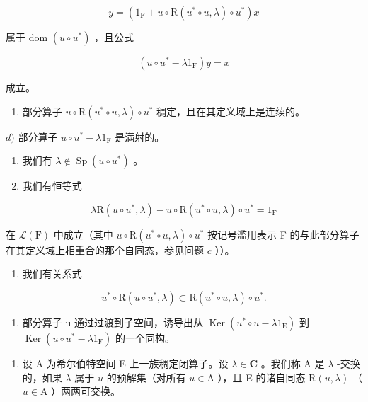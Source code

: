 \[
y = (1 _ {\mathrm{F}} + u \circ \mathrm{R} (u ^ {*} \circ u, \lambda) \circ u ^ {*}) x
\]

属于 dom \((u\circ u^{*})\) ，且公式

\[
(u \circ u ^ {*} - \lambda 1 _ {\mathrm{F}}) y = x
\]

成立。

\begin{enumerate}
\def\labelenumi{\alph{enumi})}
\setcounter{enumi}{2}
\tightlist
\item
  部分算子 \(u \circ \mathrm{R}(u^* \circ u, \lambda) \circ u^*\) 稠定，且在其定义域上是连续的。
\end{enumerate}

\(d)\) 部分算子 \(u \circ u^{*} - \lambda 1_{\mathrm{F}}\) 是满射的。

\begin{enumerate}
\def\labelenumi{\alph{enumi})}
\setcounter{enumi}{4}
\item
  我们有 \(\lambda \notin \operatorname{Sp}(u \circ u^{*})\) 。
\item
  我们有恒等式
\end{enumerate}

\[
\lambda \mathrm{R} (u \circ u ^ {*}, \lambda) - u \circ \mathrm{R} (u ^ {*} \circ u, \lambda) \circ u ^ {*} = 1 _ {\mathrm{F}}
\]

在 \(\mathcal{L}(\mathrm{F})\) 中成立（其中 \(u\circ \mathrm{R}(u^{*}\circ u,\lambda)\circ u^{*}\) 按记号滥用表示 F 的与此部分算子在其定义域上相重合的那个自同态，参见问题 \(c\) ））。

\begin{enumerate}
\def\labelenumi{\alph{enumi})}
\setcounter{enumi}{6}
\tightlist
\item
  我们有关系式
\end{enumerate}

\[
u ^ {*} \circ \mathrm{R} (u \circ u ^ {*}, \lambda) \subset \mathrm{R} (u ^ {*} \circ u, \lambda) \circ u ^ {*}.
\]

\begin{enumerate}
\def\labelenumi{\alph{enumi})}
\setcounter{enumi}{7}
\tightlist
\item
  部分算子 u 通过过渡到子空间，诱导出从 \(\operatorname{Ker}(u^{*} \circ u - \lambda1_{\mathrm{E}})\) 到 \(\operatorname{Ker}(u \circ u^{*} - \lambda1_{\mathrm{F}})\) 的一个同构。
\end{enumerate}

\begin{enumerate}
\def\labelenumi{\arabic{enumi})}
\setcounter{enumi}{6}
\tightlist
\item
  设 A 为希尔伯特空间 E 上一族稠定闭算子。设 \(\lambda \in \mathbf{C}\) 。我们称 A 是 \(\lambda\) -交换的，如果 \(\lambda\) 属于 \(u\) 的预解集（对所有 \(u \in \mathrm{A}\) ），且 E 的诸自同态 \(\mathrm{R}(u, \lambda)\) （\(u \in \mathrm{A}\) ）两两可交换。
\end{enumerate}

